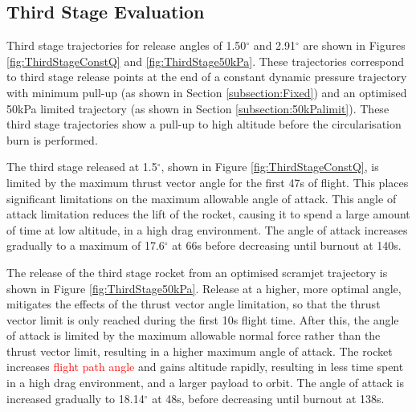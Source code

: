 \documentclass[journal]{new-aiaa}
\newcommand{\SeparationAngleConstq}{1.50}
\newcommand{\SeparationAngleFiftykPa}{2.91}
\begin{document}
 
\subsection{Third Stage Evaluation}

Third stage trajectories for release angles of \SeparationAngleConstq $^\circ$ and \SeparationAngleFiftykPa $^\circ$ are shown in Figures \ref{fig:ThirdStageConstQ} and \ref{fig:ThirdStage50kPa}. 
These trajectories correspond to third stage release points at the end of a constant dynamic pressure trajectory with minimum pull-up (as shown in Section \ref{subsection:Fixed}) and an optimised 50kPa limited trajectory  (as shown in Section \ref{subsection:50kPalimit}). 
These third stage trajectories show a pull-up to high altitude before the circularisation burn is performed. 

The third stage released at 1.5$^\circ$, shown in Figure \ref{fig:ThirdStageConstQ}, is limited by the maximum thrust vector angle for the first 47s of flight. This places significant limitations on the maximum allowable angle of attack. This angle of attack limitation reduces the lift of the rocket, causing it to spend a large amount of time at low altitude, in a high drag environment. The angle of attack increases gradually to a maximum of 17.6$^\circ$ at 66s before decreasing until burnout at 140s. 

The release of the third stage rocket from an optimised scramjet trajectory is shown in Figure \ref{fig:ThirdStage50kPa}. Release at a higher, more optimal angle, mitigates the effects of the thrust vector angle limitation, so that the thrust vector limit is only reached during the first 10s flight time. After this, the angle of attack is limited by the maximum allowable normal force rather than the thrust vector limit, resulting in a higher maximum angle of attack. The rocket increases \textcolor{red}{flight path angle} and gains altitude rapidly, resulting in less time spent in a high drag environment, and a larger payload to orbit.  The angle of attack is increased gradually to 18.14$^\circ$ at 48s, before decreasing until burnout at 138s.
\end{document}

